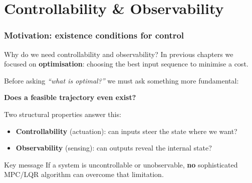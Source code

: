 \documentclass[aspectratio=169,10pt]{beamer}
\begin{document}
\part{Controllability \& Observability}

\section{Motivation: existence conditions for control}

\begin{frame}{Why do we need controllability and observability?}
In previous chapters we focused on \textbf{optimisation}: choosing the
best input sequence to minimise a cost.

Before asking \emph{``what is optimal?''} we must ask something more
fundamental:

\begin{center}
\textbf{Does a feasible trajectory even exist?}
\end{center}

Two structural properties answer this:
\begin{itemize}
  \item \textbf{Controllability} (actuation): can inputs steer the state
        where we want?
  \item \textbf{Observability} (sensing): can outputs reveal the
        internal state?
\end{itemize}

\begin{alertbox}{Key message}
If a system is uncontrollable or unobservable, \textbf{no} sophisticated
MPC/LQR algorithm can overcome that limitation.
\end{alertbox}
\end{frame}
\end{document}
